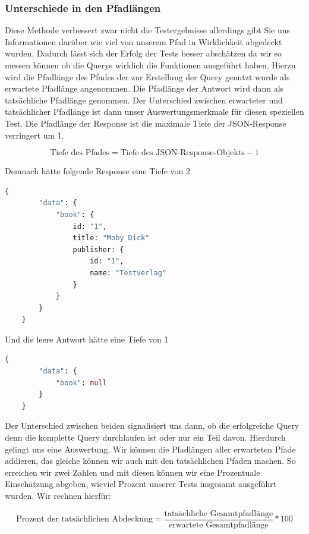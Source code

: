 \subsubsection{Unterschiede in den Pfadlängen}
Diese Methode verbessert zwar nicht die Testergebnisse allerdings gibt Sie uns Informationen darüber wie viel von unserem Pfad in Wirklichkeit
abgedeckt wurden.
Dadurch lässt sich der Erfolg der Tests besser abschätzen da wir so messen können ob die Querys wirklich die Funktionen ausgeführt haben.
Hierzu wird die Pfadlänge des Pfades der zur Erstellung der Query genutzt wurde als erwartete Pfadlänge angenommen.
Die Pfadlänge der Antwort wird dann als tatsächliche Pfadlänge genommen.
Der Unterschied zwischen erwarteter und tatsächlicher Pfadlänge ist dann unser Auswertungsmerkmale für diesen speziellen Test.
Die Pfadlänge der Response ist die maximale Tiefe der JSON-Response verringert um 1.

\[ \text{Tiefe des Pfades} = \text{Tiefe des JSON-Response-Objekts} - 1 \]

Demnach hätte folgende Response eine Tiefe von 2
\begin{lstlisting}[language=GraphQL, caption={vollständige Response}]
    {
        "data": {
            "book": {
                id: "1",
                title: "Moby Dick"
                publisher: {
                    id: "1",
                    name: "Testverlag"
                }
            }
        }
    }
\end{lstlisting}

Und die leere Antwort hätte eine Tiefe von 1

\begin{lstlisting}[language=GraphQL, caption={mangelhafte Response}]
    {
        "data": {
            "book": null
        }
    }
\end{lstlisting}

Der Unterschied zwischen beiden signalisiert uns dann, ob die erfolgreiche Query denn die komplette Query durchlaufen ist oder nur ein Teil
davon.
Hierdurch gelingt uns eine Auswertung.
Wir können die Pfadlängen aller erwarteten Pfade addieren, das gleiche können wir auch mit den tatsächlichen Pfaden machen.
So erreichen wir zwei Zahlen und mit diesen können wir eine Prozentuale Einschätzung abgeben, wieviel Prozent unserer Tests
insgesamt ausgeführt wurden.
Wir rechnen hierfür:

\[ \text{Prozent der tatsächlichen Abdeckung} = \frac{\text{tatsächliche Gesamtpfadlänge}}{\text{erwartete Gesamtpfadlänge}} * 100 \]

